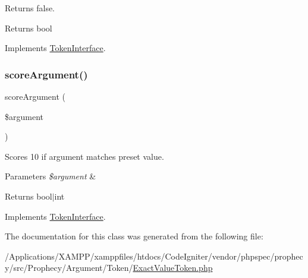 Returns false.

\begin{DoxyReturn}{Returns}
bool 
\end{DoxyReturn}


Implements \mbox{\hyperlink{interface_prophecy_1_1_argument_1_1_token_1_1_token_interface_ac72b8349b1340887fc1af30eca2b951c}{Token\+Interface}}.

\mbox{\label{class_prophecy_1_1_argument_1_1_token_1_1_exact_value_token_a8d5bf47ab6eaa935458d5ad160e52822}} 
\subsubsection{\texorpdfstring{score\+Argument()}{scoreArgument()}}
{\footnotesize\ttfamily score\+Argument (\begin{DoxyParamCaption}\item[{}]{\$argument }\end{DoxyParamCaption})}

Scores 10 if argument matches preset value.


\begin{DoxyParams}{Parameters}
{\em \$argument} & \\
\hline
\end{DoxyParams}
\begin{DoxyReturn}{Returns}
bool$\vert$int 
\end{DoxyReturn}


Implements \mbox{\hyperlink{interface_prophecy_1_1_argument_1_1_token_1_1_token_interface_a8d5bf47ab6eaa935458d5ad160e52822}{Token\+Interface}}.



The documentation for this class was generated from the following file\+:\begin{DoxyCompactItemize}
\item 
/\+Applications/\+X\+A\+M\+P\+P/xamppfiles/htdocs/\+Code\+Igniter/vendor/phpspec/prophecy/src/\+Prophecy/\+Argument/\+Token/\mbox{\hyperlink{_exact_value_token_8php}{Exact\+Value\+Token.\+php}}\end{DoxyCompactItemize}
